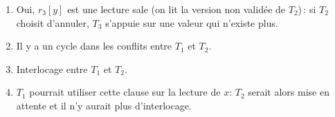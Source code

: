 \begin{solution}
\begin{enumerate}
   \item Oui, $r_3[y]$ est une lecture sale (on lit la version non validée
    de $T_2$)\,: si $T_2$ choisit d'annuler, $T_3$ s'appuie sur une
      valeur qui n'existe plus.

    \item Il y a un cycle dans les conflits entre $T_1$ et $T_2$.

     \item Interlocage entre $T_1$ et $T_2$.

   \item $T_1$ pourrait utiliser cette clause sur la lecture de $x$:
   $T_2$ serait alors mise en attente et il n'y aurait plus d'interlocage.
\end{enumerate}
\end{solution}
